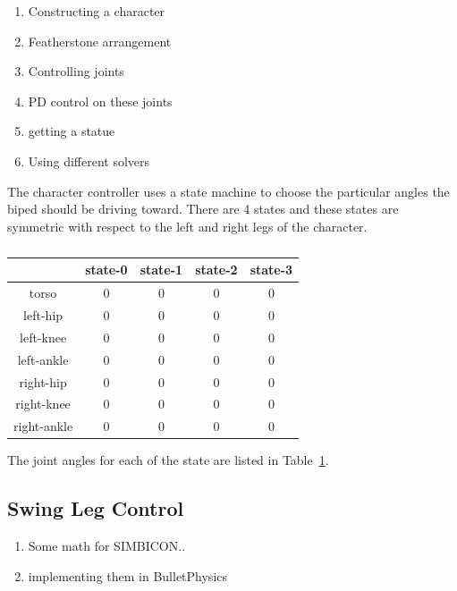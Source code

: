 \begin{enumerate}
	\item Constructing a character
	\item Featherstone arrangement
	\item Controlling joints
	\item PD control on these joints
	\item getting a statue
	\item Using different solvers	
\end{enumerate}

The character controller uses a state machine to choose the particular angles the biped should be driving toward. 
There are 4 states and these states are symmetric with respect to the left and right legs of the character.

\begin{table}
\centering
	\begin{tabular}{ c | c | c | c | c }
		            & state-0 & state-1 & state-2 & state-3 \\ \hline
         torso      &    0    &    0    &    0    & 0       \\
		 left-hip   &    0    &    0    &    0    & 0       \\
		 left-knee  &    0    &    0    &    0    & 0       \\
		left-ankle  &    0    &    0    &    0    & 0       \\
		 right-hip  &    0    &    0    &    0    & 0       \\
		right-knee  &    0    &    0    &    0    & 0       \\
		right-ankle &    0    &    0    &    0    & 0
	\end{tabular}
	\caption{\label{table:controler-values}}
\end{table}

The joint angles for each of the state are listed in Table~\ref{table:controler-values}.


\subsection{Swing Leg Control}

\begin{enumerate}
	\item Some math for SIMBICON..
	\item implementing them in BulletPhysics
\end{enumerate}